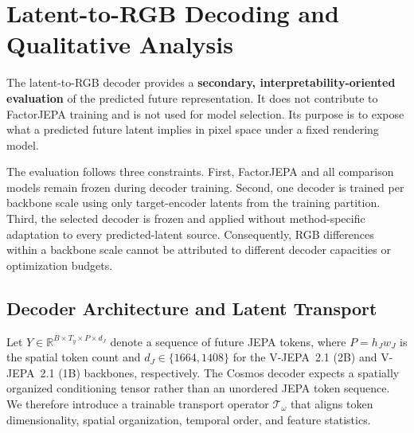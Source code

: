 \iffalse
\section{Latent-to-RGB Decoding and Qualitative Analysis}
\label{app:rgb_decoder}

The latent-to-RGB decoder provides a \textbf{secondary,
interpretability-oriented evaluation} of the predicted future
representation. It does not contribute to FactorJEPA training and is
not used for model selection. Its purpose is to expose what a predicted
future latent implies in pixel space under a fixed rendering model.

The evaluation follows three constraints. First, FactorJEPA and all
comparison models remain frozen during decoder training. Second, one
decoder is trained per backbone scale using only target-encoder latents
from the training partition. Third, the selected decoder is frozen and
applied without method-specific adaptation to every predicted-latent
source. Consequently, RGB differences within a backbone scale cannot
be attributed to different decoder capacities or optimization budgets.


\subsection{Decoder Architecture and Latent Transport}
\label{app:rgb_architecture}

Let
\(
Y\in\mathbb{R}^{B\times T_y\times P\times d_J}
\)
denote a sequence of future JEPA tokens, where \(P=h_Jw_J\) is the
spatial token count and \(d_J\in\{1664,1408\}\) for the V-JEPA~2.1 (2B) and
V-JEPA~2.1 (1B) backbones, respectively. The Cosmos decoder expects a spatially
organized conditioning tensor rather than an unordered JEPA token
sequence. We therefore introduce a trainable transport operator
\(\mathcal T_\omega\) that aligns token dimensionality, spatial
organization, temporal order, and feature statistics.

